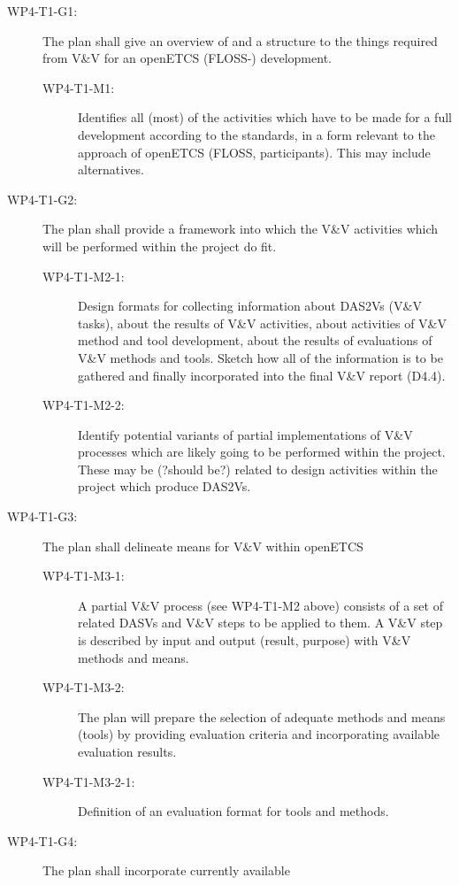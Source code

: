 \documentclass{template/openetcs_report}
\begin{document}
\begin{description}
\item[WP4-T1-G1:] The plan shall give an overview of and a structure to
  the things required from V\&V for an openETCS (FLOSS-) development.
  \begin{description}
  \item[WP4-T1-M1:] Identifies all (most) of the activities which have
    to be made for a full development according to the standards, in a
    form relevant to the approach of openETCS (FLOSS,
    participants). This may include alternatives.
  \end{description}
\item[WP4-T1-G2:] The plan shall provide a framework into which the V\&V
  activities which will be performed within the project do fit.
  \begin{description}
  \item[WP4-T1-M2-1:] Design formats for collecting information about
    DAS2Vs (V\&V tasks), about the results of V\&V activities, about
    activities of V\&V method and tool development, about the results
    of evaluations of V\&V methods and tools. Sketch how all of the
    information is to be gathered and finally incorporated into the
    final V\&V report (D4.4).
  \item[WP4-T1-M2-2:] Identify potential variants of partial
    implementations of V\&V processes which are likely going to be
    performed within the project. These may be (?should be?) related
    to design activities within the project which produce DAS2Vs.
  \end{description}
\item[WP4-T1-G3:] The plan shall delineate means for V\&V within openETCS
  \begin{description}
  \item[WP4-T1-M3-1:] A partial V\&V process (see WP4-T1-M2 above)
    consists of a set of related DASVs and V\&V steps to be applied to
    them. A V\&V step is described by input and output (result,
    purpose) with V\&V methods and means.
  \item[WP4-T1-M3-2:] The plan will prepare the selection of adequate
    methods and means (tools) by providing evaluation criteria and
    incorporating available evaluation results.
  \item[WP4-T1-M3-2-1:] Definition of an evaluation format for tools
    and methods.
  \end{description}
\item[WP4-T1-G4:] The plan shall incorporate currently available

\end{description}
\end{document}

